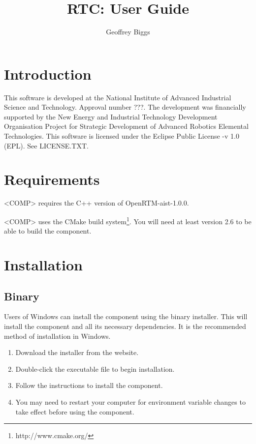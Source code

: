 \documentclass[a4paper,10pt]{article}
\title{RTC: User Guide}
\author{Geoffrey Biggs}
\begin{document}
\maketitle

\section{Introduction}
\label{sec:intro}


This software is developed at the National Institute of Advanced Industrial
Science and Technology. Approval number ???. The development was
financially supported by the New Energy and Industrial Technology Development
Organisation Project for Strategic Development of Advanced Robotics Elemental
Technologies.  This software is licensed under the Eclipse Public License -v
1.0 (EPL). See LICENSE.TXT.

\section{Requirements}
\label{sec:requirements}

<COMP> requires the C++ version of OpenRTM-aist-1.0.0.

<COMP> uses the CMake build system\footnote{http://www.cmake.org/}. You will
need at least version 2.6 to be able to build the component.

\section{Installation}
\label{sec:installation}

\subsection{Binary}

Users of Windows can install the component using the binary installer. This
will install the component and all its necessary dependencies. It is the
recommended method of installation in Windows.

\begin{enumerate}
  \item Download the installer from the website.
  \item Double-click the executable file to begin installation.
  \item Follow the instructions to install the component.
  \item You may need to restart your computer for environment variable changes
  to take effect before using the component.
\end{enumerate}
\end{document}
